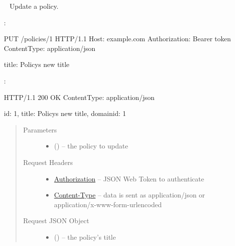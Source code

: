 \documentclass[letterpaper,10pt,english]{sphinxmanual}
\begin{document}
\begin{fulllineitems}
\label{\detokenize{resources/policy:put--policies-(policy_id)}}~
Update a policy.

:

\begin{sphinxVerbatim}[commandchars=\\\{\}]
PUT /policies/1 HTTP/1.1
Host: example.com
Authorization: Bearer \PYGZlt{}token\PYGZgt{}
Content\PYGZhy{}Type: application/json

\PYGZob{}
    \PYGZsq{}title\PYGZsq{}: \PYGZsq{}Policy\PYGZsq{}s new title\PYGZsq{}
\PYGZcb{}
\end{sphinxVerbatim}

:

\begin{sphinxVerbatim}[commandchars=\\\{\}]
HTTP/1.1 200 OK
Content\PYGZhy{}Type: application/json

\PYGZob{}
    \PYGZsq{}id\PYGZsq{}: 1,
    \PYGZsq{}title\PYGZsq{}: \PYGZsq{}Policy\PYGZsq{}s new title\PYGZsq{},
    \PYGZsq{}domain\PYGZus{}id\PYGZsq{}: 1
\PYGZcb{}
\end{sphinxVerbatim}
\begin{quote}\begin{description}
\item[{Parameters}] \leavevmode\begin{itemize}
\item {} 
 () -- the policy to update

\end{itemize}

\item[{Request Headers}] \leavevmode\begin{itemize}
\item {} 
\href{http://tools.ietf.org/html/rfc7235\#section-4.2}{Authorization} -- JSON Web Token to authenticate

\item {} 
\href{http://tools.ietf.org/html/rfc7231\#section-3.1.1.5}{Content-Type} -- data is sent as application/json or
application/x-www-form-urlencoded

\end{itemize}

\item[{Request JSON Object}] \leavevmode\begin{itemize}
\item {} 
 () -- the policy's title


\end{itemize}
\end{description}
\end{quote}
\end{fulllineitems}
\end{document}

